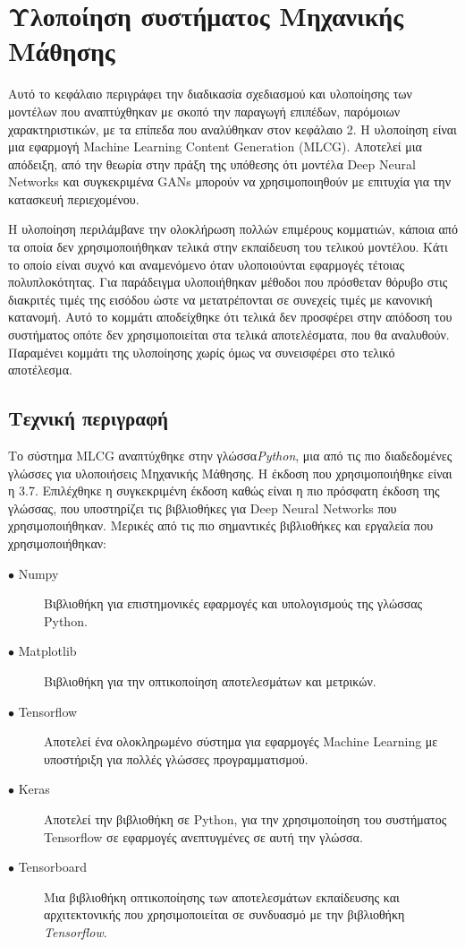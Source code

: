 \chapter{Υλοποίηση συστήματος Μηχανικής Μάθησης}

Αυτό το κεφάλαιο περιγράφει την διαδικασία σχεδιασμού και υλοποίησης των μοντέλων που αναπτύχθηκαν με σκοπό την παραγωγή επιπέδων, παρόμοιων χαρακτηριστικών, με τα επίπεδα που αναλύθηκαν στον κεφάλαιο 2. Η υλοποίηση είναι μια εφαρμογή Machine Learning Content Generation (MLCG). Αποτελεί μια απόδειξη, από την θεωρία στην πράξη της υπόθεσης ότι μοντέλα Deep Neural Networks και συγκεκριμένα GANs μπορούν να χρησιμοποιηθούν με επιτυχία για την κατασκευή περιεχομένου.
\par
Η υλοποίηση περιλάμβανε την ολοκλήρωση πολλών επιμέρους κομματιών, κάποια από τα οποία δεν χρησιμοποιήθηκαν τελικά στην εκπαίδευση του τελικού μοντέλου. Κάτι το οποίο είναι συχνό και αναμενόμενο όταν υλοποιούνται εφαρμογές τέτοιας πολυπλοκότητας. Για παράδειγμα υλοποιήθηκαν μέθοδοι που πρόσθεταν θόρυβο στις διακριτές τιμές της εισόδου ώστε να μετατρέπονται σε συνεχείς τιμές με κανονική κατανομή. Αυτό το κομμάτι αποδείχθηκε ότι τελικά δεν προσφέρει στην απόδοση του συστήματος οπότε δεν χρησιμοποιείται στα τελικά αποτελέσματα, που θα αναλυθούν. Παραμένει κομμάτι της υλοποίησης χωρίς όμως να συνεισφέρει στο τελικό αποτέλεσμα.

\section{Τεχνική περιγραφή}
Το σύστημα MLCG αναπτύχθηκε στην γλώσσα\textit{Python}, μια από τις πιο διαδεδομένες γλώσσες για υλοποιήσεις Μηχανικής Μάθησης. Η έκδοση που χρησιμοποιήθηκε είναι η 3.7. Επιλέχθηκε η συγκεκριμένη έκδοση καθώς είναι η πιο πρόσφατη έκδοση της γλώσσας, που υποστηρίζει τις βιβλιοθήκες για Deep Neural Networks που χρησιμοποιήθηκαν. 
Μερικές από τις πιο σημαντικές βιβλιοθήκες και εργαλεία που χρησιμοποιήθηκαν:

\begin{description}
\item[$\bullet$ Numpy] Βιβλιοθήκη για επιστημονικές εφαρμογές και υπολογισμούς της γλώσσας Python.
\item[$\bullet$ Matplotlib] Βιβλιοθήκη για την οπτικοποίηση αποτελεσμάτων και μετρικών.
\item[$\bullet$ Tensorflow] Αποτελεί ένα ολοκληρωμένο σύστημα για εφαρμογές Machine Learning με υποστήριξη για πολλές γλώσσες προγραμματισμού. 
\item[$\bullet$ Keras] Αποτελεί την βιβλιοθήκη σε Python, για την χρησιμοποίηση του συστήματος Tensorflow σε εφαρμογές ανεπτυγμένες σε αυτή την γλώσσα.
\item[$\bullet$ Tensorboard] Μια βιβλιοθήκη οπτικοποίησης των αποτελεσμάτων εκπαίδευσης και αρχιτεκτονικής που χρησιμοποιείται σε συνδυασμό με την βιβλιοθήκη \textit{Tensorflow}. 
\end{description}


